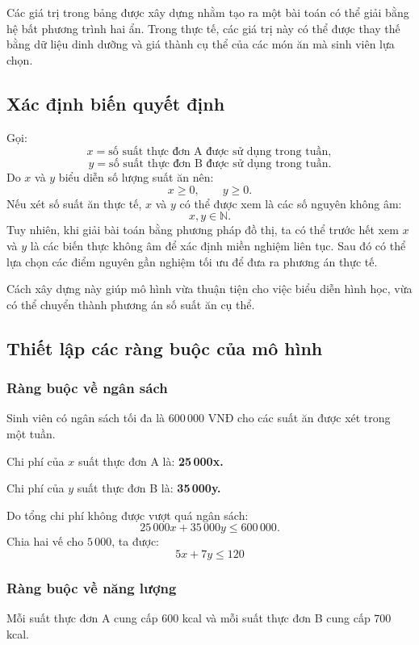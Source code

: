 \documentclass[12pt,a4paper]{article}
\begin{document}
Các giá trị trong bảng được xây dựng nhằm tạo ra một bài toán có thể giải bằng hệ bất phương trình hai ẩn. Trong thực tế, các giá trị này có thể được thay thế bằng dữ liệu dinh dưỡng và giá thành cụ thể của các món ăn mà sinh viên lựa chọn.

\subsection{Xác định biến quyết định}

Gọi:
\[
x = \text{số suất thực đơn A được sử dụng trong tuần},
\]
\[
y = \text{số suất thực đơn B được sử dụng trong tuần}.
\]
Do $x$ và $y$ biểu diễn số lượng suất ăn nên:
\[
x\geq0,\qquad y\geq0.
\]
Nếu xét số suất ăn thực tế, $x$ và $y$ có thể được xem là các số nguyên không âm:
\[
x,y\in\mathbb{N}.
\]
Tuy nhiên, khi giải bài toán bằng phương pháp đồ thị, ta có thể trước hết xem $x$ và $y$ là các biến thực không âm để xác định miền nghiệm liên tục. Sau đó có thể lựa chọn các điểm nguyên gần nghiệm tối ưu để đưa ra phương án thực tế.

Cách xây dựng này giúp mô hình vừa thuận tiện cho việc biểu diễn hình học, vừa có thể chuyển thành phương án số suất ăn cụ thể.

\subsection{Thiết lập các ràng buộc của mô hình}

\subsubsection{Ràng buộc về ngân sách}

Sinh viên có ngân sách tối đa là $600\,000$ VNĐ cho các suất ăn được xét trong một tuần.

Chi phí của $x$ suất thực đơn A là: \textbf{25\,000x.}

Chi phí của $y$ suất thực đơn B là: \textbf{35\,000y.}

Do tổng chi phí không được vượt quá ngân sách:
\[
25\,000x+35\,000y\leq600\,000.
\]
Chia hai vế cho $5\,000$, ta được:
\[
\boxed{
5x+7y\leq120
}
\tag{1}
\]

\subsubsection{Ràng buộc về năng lượng}

Mỗi suất thực đơn A cung cấp $600$ kcal và mỗi suất thực đơn B cung
cấp $700$ kcal.
\end{document}
